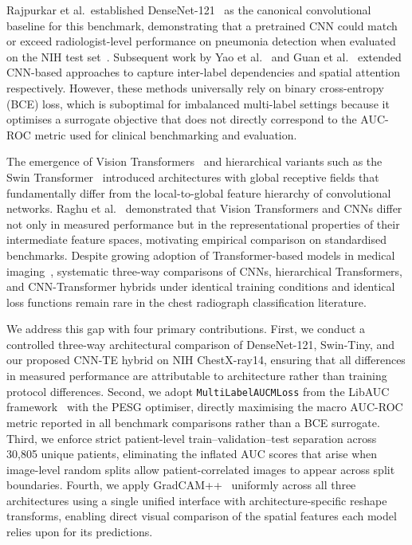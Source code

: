\documentclass[conference]{IEEEtran}
\begin{document}
Rajpurkar et al.\ established DenseNet-121~\cite{huang2017} as the
canonical convolutional baseline for this benchmark, demonstrating that
a pretrained CNN could match or exceed radiologist-level performance on
pneumonia detection when evaluated on the NIH test
set~\cite{rajpurkar2017}. Subsequent work by Yao et al.~\cite{yao2018}
and Guan et al.~\cite{guan2020} extended CNN-based approaches to
capture inter-label dependencies and spatial attention respectively.
However, these methods universally rely on binary cross-entropy (BCE)
loss, which is suboptimal for imbalanced multi-label settings because
it optimises a surrogate objective that does not directly correspond to
the AUC-ROC metric used for clinical benchmarking and evaluation.

The emergence of Vision Transformers~\cite{dosovitskiy2021} and
hierarchical variants such as the Swin Transformer~\cite{liu2021}
introduced architectures with global receptive fields that
fundamentally differ from the local-to-global feature hierarchy of
convolutional networks. Raghu et al.~\cite{raghu2021} demonstrated
that Vision Transformers and CNNs differ not only in measured
performance but in the representational properties of their
intermediate feature spaces, motivating empirical comparison on
standardised benchmarks. Despite growing adoption of Transformer-based
models in medical imaging~\cite{matsoukas2021}, systematic three-way
comparisons of CNNs, hierarchical Transformers, and CNN-Transformer
hybrids under identical training conditions and identical loss functions
remain rare in the chest radiograph classification literature.

We address this gap with four primary contributions. First, we conduct
a controlled three-way architectural comparison of DenseNet-121,
Swin-Tiny, and our proposed CNN-TE hybrid on NIH ChestX-ray14, ensuring
that all differences in measured performance are attributable to
architecture rather than training protocol differences. Second, we adopt
\texttt{MultiLabelAUCMLoss} from the LibAUC framework~\cite{yuan2021}
with the PESG optimiser, directly maximising the macro AUC-ROC metric
reported in all benchmark comparisons rather than a BCE surrogate.
Third, we enforce strict patient-level train--validation--test
separation across 30,805 unique patients, eliminating the inflated AUC
scores that arise when image-level random splits allow patient-correlated
images to appear across split boundaries. Fourth, we apply
GradCAM++~\cite{chattopadhay2018} uniformly across all three
architectures using a single unified interface with architecture-specific
reshape transforms, enabling direct visual comparison of the spatial
features each model relies upon for its predictions.
\end{document}
